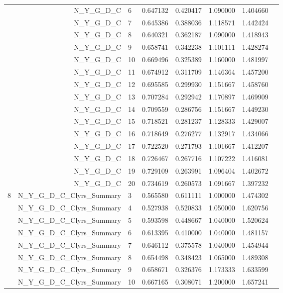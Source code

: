 \documentclass[a4paper,12pt]{article}
\begin{document}
\begin{center}
\begin{longtable}{lrlrrrrr}
& N\_Y\_G\_D\_C & 6 & 0.647132 & 0.420417 & 1.090000 & 1.404660 \\
& N\_Y\_G\_D\_C & 7 & 0.645386 & 0.388036 & 1.118571 & 1.442424 \\
& N\_Y\_G\_D\_C & 8 & 0.640321 & 0.362187 & 1.090000 & 1.418943 \\
& N\_Y\_G\_D\_C & 9 & 0.658741 & 0.342238 & 1.101111 & 1.428274 \\
& N\_Y\_G\_D\_C & 10 & 0.669496 & 0.325389 & 1.160000 & 1.481997 \\
& N\_Y\_G\_D\_C & 11 & 0.674912 & 0.311709 & 1.146364 & 1.457200 \\
& N\_Y\_G\_D\_C & 12 & 0.695585 & 0.299930 & 1.151667 & 1.458760 \\
& N\_Y\_G\_D\_C & 13 & 0.707284 & 0.292942 & 1.170897 & 1.469909 \\
& N\_Y\_G\_D\_C & 14 & 0.709559 & 0.286756 & 1.151667 & 1.449230 \\
& N\_Y\_G\_D\_C & 15 & 0.718521 & 0.281237 & 1.128333 & 1.429007 \\
& N\_Y\_G\_D\_C & 16 & 0.718649 & 0.276277 & 1.132917 & 1.434066 \\
& N\_Y\_G\_D\_C & 17 & 0.722520 & 0.271793 & 1.101667 & 1.412207 \\
& N\_Y\_G\_D\_C & 18 & 0.726467 & 0.267716 & 1.107222 & 1.416081 \\
& N\_Y\_G\_D\_C & 19 & 0.729109 & 0.263991 & 1.096404 & 1.402672 \\
& N\_Y\_G\_D\_C & 20 & 0.734619 & 0.260573 & 1.091667 & 1.397232 \\ \hline
\multirow{18}{1cm}{8} & N\_Y\_G\_D\_C\_Clyrs\_Summary & 3 & 0.565580 & 0.611111 & 1.000000 & 1.474302 \\
& N\_Y\_G\_D\_C\_Clyrs\_Summary & 4 & 0.527938 & 0.520833 & 1.050000 & 1.620756 \\
& N\_Y\_G\_D\_C\_Clyrs\_Summary & 5 & 0.593598 & 0.448667 & 1.040000 & 1.520624 \\
& N\_Y\_G\_D\_C\_Clyrs\_Summary & 6 & 0.613395 & 0.410000 & 1.040000 & 1.481157 \\
& N\_Y\_G\_D\_C\_Clyrs\_Summary & 7 & 0.646112 & 0.375578 & 1.040000 & 1.454944 \\
& N\_Y\_G\_D\_C\_Clyrs\_Summary & 8 & 0.654498 & 0.348423 & 1.065000 & 1.489308 \\
& N\_Y\_G\_D\_C\_Clyrs\_Summary & 9 & 0.658671 & 0.326376 & 1.173333 & 1.633599 \\
& N\_Y\_G\_D\_C\_Clyrs\_Summary & 10 & 0.667165 & 0.308071 & 1.200000 & 1.657241 \\

\end{longtable}
\end{center}
\end{document}
